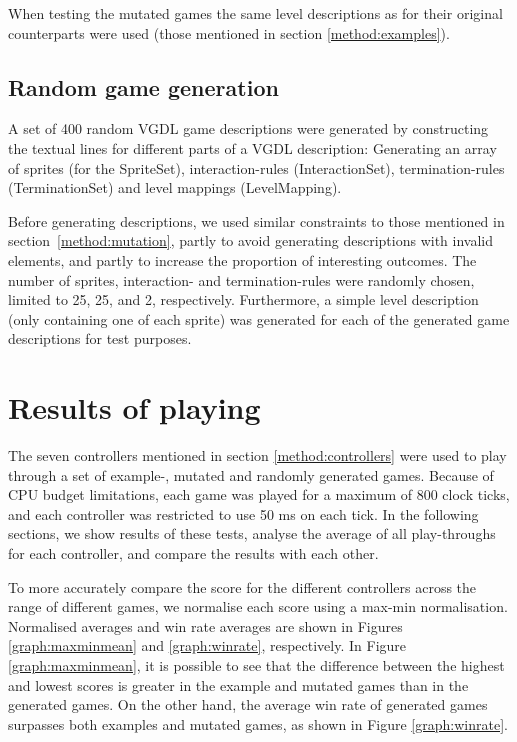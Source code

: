 \documentclass[a4paper,titlepage,final, twoside]{report}
\begin{document}
When testing the mutated games the same level descriptions as for their original counterparts were used (those mentioned in section \ref{method:examples}).




\subsection{Random game generation}
\label{method:random}

A set of 400 random VGDL game descriptions were generated by constructing the textual lines for different parts of a VGDL description: Generating an array of sprites (for the SpriteSet), interaction-rules (InteractionSet), termination-rules (TerminationSet) and level mappings (LevelMapping).



Before generating descriptions, we used similar constraints to those mentioned in section~\ref{method:mutation}, partly to avoid generating descriptions with invalid elements, and partly to increase the proportion of interesting outcomes. 
The number of sprites, interaction- and termination-rules were randomly chosen, limited to 25, 25, and 2, respectively. Furthermore, a simple level description (only containing one of each sprite) was generated for each of the generated game descriptions for test purposes. 



\section{Results of playing}
The seven controllers mentioned in section \ref{method:controllers} were used to play through a set of example-, mutated and randomly generated games. Because of CPU budget limitations, each game was played for a maximum of 800 clock ticks, and each controller was restricted to use 50 ms on each tick. In the following sections, we show results of these tests, analyse the average of all play-throughs for each controller, and compare the results with each other.

To more accurately compare the score for the different controllers across the range of different games, we normalise each score using a max-min normalisation. 
Normalised averages and win rate averages are shown in Figures \ref{graph:maxminmean} and \ref{graph:winrate}, respectively. In Figure \ref{graph:maxminmean}, it is possible to see that the difference between the highest and lowest scores is greater in the example and mutated games than in the generated games. On the other hand, the average win rate of generated games surpasses both examples and mutated games, as shown in Figure \ref{graph:winrate}.
\end{document}

